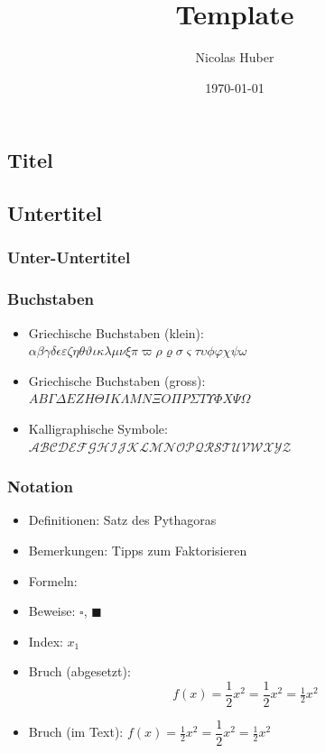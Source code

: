 \documentclass[fontsize=10pt]{scrartcl}
\title{Template}
\author{Nicolas Huber}
\date{\today}
\begin{document}
\begin{cheatsheet}
\maketitle

\section{Titel}
\subsection{Untertitel}
\subsubsection{Unter-Untertitel}

\subsubsection{Buchstaben}
\begin{itemize}
    \item Griechische Buchstaben (klein): \\
          $\alpha \beta \gamma \delta \epsilon \varepsilon \zeta \eta \theta \vartheta \iota \kappa \lambda \mu \nu \xi
           \pi \varpi \rho \varrho \sigma \varsigma \tau \upsilon \phi \varphi \chi \psi \omega$
    \item Griechische Buchstaben (gross): \\
          $A B \Gamma \Delta E Z H \Theta I K \Lambda M N \Xi O \Pi P \Sigma T \Upsilon \Phi X \Psi \Omega$
    \item Kalligraphische Symbole: \\ $\mathcal{ABCDEFGHIJKLMNOPQRSTUVWXYZ}$
\end{itemize}

\subsubsection{Notation}
\begin{itemize}
    \item Definitionen:  Satz des Pythagoras
    \item Bemerkungen: \bem Tipps zum Faktorisieren
    \item Formeln: 
    \item Beweise: $\square$, $\blacksquare$
    \item Index: $x_1$
    \item Bruch (abgesetzt): \[ f(x) = \frac{1}{2} x^2 = \dfrac{1}{2} x^2 = \tfrac{1}{2} x^2 \]
    \item Bruch (im Text): $f(x) = \frac{1}{2} x^2 = \dfrac{1}{2} x^2 = \tfrac{1}{2} x^2$
\end{itemize}


\end{cheatsheet}
\end{document}
